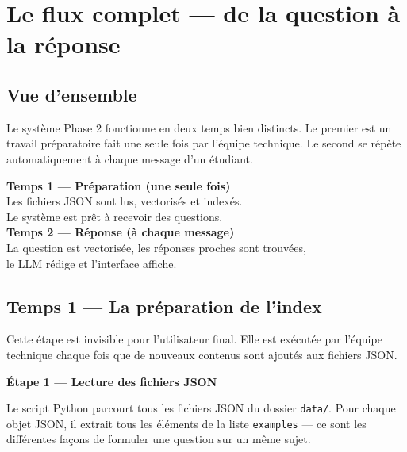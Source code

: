 \documentclass[11pt,a4paper]{article}
\begin{document}
\section{Le flux complet --- de la question à la réponse}

\subsection{Vue d'ensemble}

Le système Phase 2 fonctionne en deux temps bien distincts.
Le premier est un travail préparatoire fait une seule fois
par l'équipe technique. Le second se répète automatiquement
à chaque message d'un étudiant.

\begin{schema}
\textbf{Temps 1 --- Préparation (une seule fois)} \\
\hspace{1cm} Les fichiers JSON sont lus, vectorisés et indexés. \\
\hspace{1cm} Le système est prêt à recevoir des questions. \\
\vspace{0.4cm}
\textbf{Temps 2 --- Réponse (à chaque message)} \\
\hspace{1cm} La question est vectorisée, les réponses proches sont
trouvées, \\
\hspace{1cm} le LLM rédige et l'interface affiche.
\end{schema}

\subsection{Temps 1 --- La préparation de l'index}

Cette étape est invisible pour l'utilisateur final. Elle est
exécutée par l'équipe technique chaque fois que de nouveaux
contenus sont ajoutés aux fichiers JSON.

\vspace{0.3cm}
\textbf{Étape 1 --- Lecture des fichiers JSON}

Le script Python parcourt tous les fichiers JSON du dossier
\texttt{data/}. Pour chaque objet JSON, il extrait tous les
éléments de la liste \texttt{examples} --- ce sont les différentes
façons de formuler une question sur un même sujet.
\end{document}
